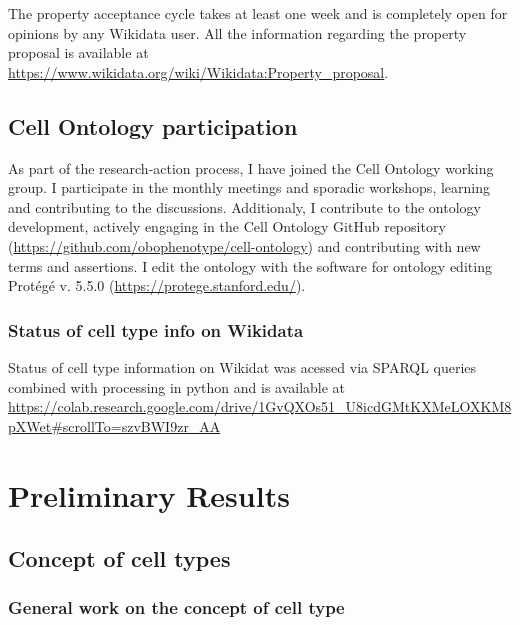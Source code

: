 The property acceptance cycle takes at least one week and is completely open for opinions by any Wikidata user. All the information regarding the property proposal is available at \url{https://www.wikidata.org/wiki/Wikidata:Property_proposal}.

\hypertarget{cell-ontology-participation}{%
\subsection{Cell Ontology participation}\label{cell-ontology-participation}}

As part of the research-action process, I have joined the Cell Ontology working group.
I participate in the monthly meetings and sporadic workshops, learning and contributing to the discussions.
Additionaly, I contribute to the ontology development, actively engaging in the Cell Ontology GitHub repository (\url{https://github.com/obophenotype/cell-ontology}) and contributing with new terms and assertions.
I edit the ontology with the software for ontology editing Protégé v. 5.5.0 (\url{https://protege.stanford.edu/}).

\hypertarget{status-of-cell-type-info-on-wikidata}{%
\subsubsection{Status of cell type info on Wikidata}\label{status-of-cell-type-info-on-wikidata}}

Status of cell type information on Wikidat was acessed via SPARQL queries combined with processing in python and is available at \url{https://colab.research.google.com/drive/1GvQXOs51_U8icdGMtKXMeLOXKM8pXWet\#scrollTo=szvBWI9zr_AA}

\hypertarget{preliminary-results}{%
\section{Preliminary Results}\label{preliminary-results}}

\hypertarget{concept-of-cell-types}{%
\subsection{Concept of cell types}\label{concept-of-cell-types}}

\hypertarget{general-work-on-the-concept-of-cell-type}{%
\subsubsection{General work on the concept of cell type}\label{general-work-on-the-concept-of-cell-type}}

